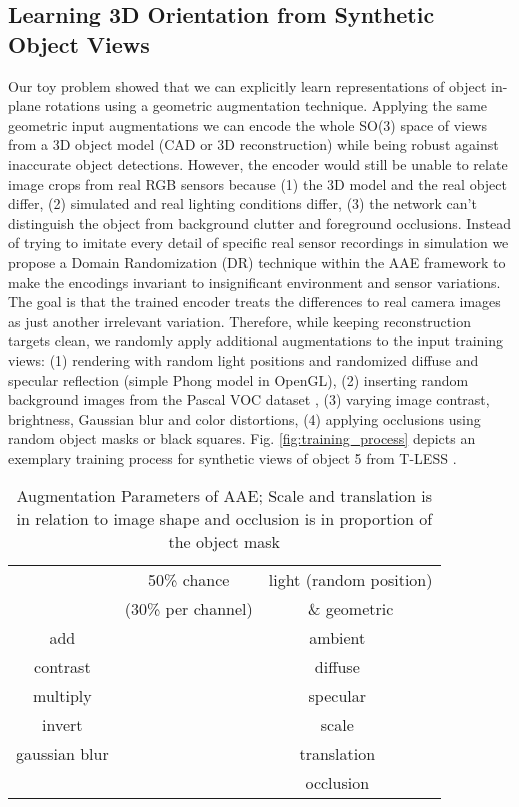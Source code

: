 \subsection{Learning 3D Orientation from Synthetic Object Views}
Our toy problem showed that we can explicitly learn representations of object in-plane rotations using a geometric augmentation technique. Applying the same geometric input augmentations we can encode the whole SO(3) space of views from a 3D object model (CAD or 3D reconstruction) while being robust against inaccurate object detections. However, the encoder would still be unable to relate image crops from real RGB sensors because 
(1) the 3D model and the real object differ, (2) simulated and real lighting conditions differ, (3) the network can't distinguish the object from background clutter and foreground occlusions. 
Instead of trying to imitate every detail of specific real sensor recordings in simulation we propose a Domain Randomization (DR) technique within the \gls{AAE} framework to make the encodings invariant to insignificant environment and sensor variations. The goal is that the trained encoder treats the differences to real camera images as just another irrelevant variation. Therefore, while keeping reconstruction targets clean, we randomly apply additional augmentations to the input training views: (1) rendering with random light positions and randomized diffuse and specular reflection (simple Phong model \citep{phong1975illumination} in OpenGL), (2) inserting random background images from the Pascal VOC dataset \citep{pascalvoc2012}, (3) varying image contrast, brightness, Gaussian blur and color distortions, (4) applying occlusions using random object masks or black squares. Fig. \ref{fig:training_process} depicts an exemplary training process for synthetic views of object 5 from T-LESS \citep{hodan2017tless}.

\begin{table}[t]
	\scriptsize
	\centering
	\captionsetup{width=0.9\columnwidth}
	\caption{Augmentation Parameters of \gls{AAE}; Scale and translation is in relation to image shape and occlusion is in proportion of the object mask}
	\begin{tabular}{cc|cc}
		\toprule
		& 50\% chance &\multicolumn{2}{c}{light (random position) } \\
		& (30\% per channel) & \multicolumn{2}{c}{\& geometric}\\
		\midrule
		add &  & ambient & \\
		contrast &  &diffuse &\\
		multiply &  & specular& \\
		invert &  & scale &\\
		gaussian blur &  & translation & \\
		&& occlusion &  
	\end{tabular}
	\label{tab:aug_strong_col}
\end{table}


